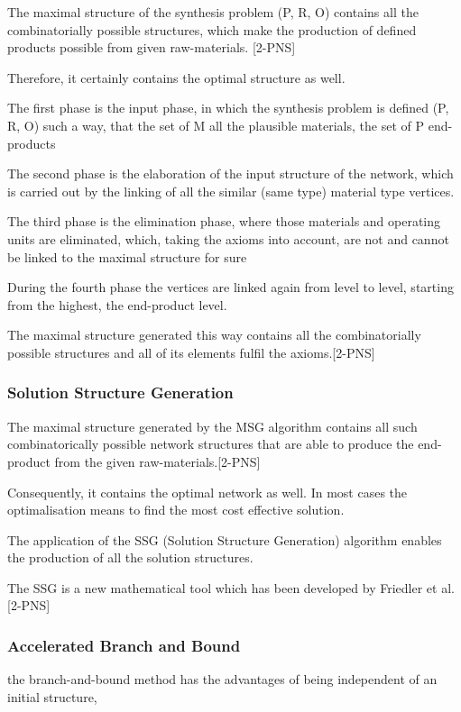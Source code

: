 The maximal structure of the synthesis problem (P, R, O) 
contains all the combinatorially possible structures,
which make the production of defined products possible 
from given raw-materials. [2-PNS]
 
Therefore, it certainly contains the optimal structure as well.

The first phase is the input phase, in which the synthesis problem 
is defined (P, R, O) such a way, that the set of M all the plausible materials, 
the set of P end-products 

The second phase is the elaboration of the input structure of the network, 
which is carried out by the linking of all the similar (same type) material type vertices.

The third phase is the elimination phase, where those materials 
and operating units are eliminated, which, taking the  axioms into account,
are not and cannot be linked to the maximal structure for sure

During the fourth phase the vertices are linked again from level to level, 
starting from the highest, the end-product level.

The maximal structure generated this way contains all the combinatorially possible 
structures and all of its elements fulfil the  axioms.[2-PNS]

\subsubsection{Solution Structure Generation}

The maximal structure generated by the MSG algorithm contains all such combinatorically 
possible network structures that are able to produce the end-product from the given raw-materials.[2-PNS]

Consequently, it contains the optimal network as well. 
In most cases the optimalisation means  to find the most cost effective solution.

The application of the SSG (Solution Structure Generation) algorithm 
enables the production of all the solution structures. 

The SSG is a new mathematical tool  which has been developed by Friedler et al.[2-PNS]

\subsubsection{Accelerated Branch and Bound}

the branch-and-bound method has the
advantages of being independent of an initial structure, 

